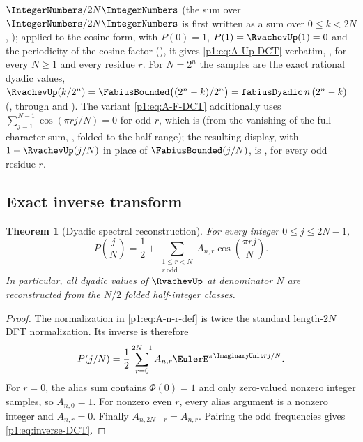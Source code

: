 \documentclass[11pt,oneside]{article}
\newtheorem{theorem}{Theorem}[section]
\theoremstyle{definition}
\theoremstyle{remark}
\newcommand{\PhiU}{\Phi}
\begin{document}
\(\IntegerNumbers/2N\IntegerNumbers\) (the sum over \(\IntegerNumbers/2N\IntegerNumbers\) is first
written as a sum over \(0\le k<2N\), ); applied to the
cosine form, with \(P(0)=1\), \(P(1)=\RvachevUp(1)=0\) and the periodicity of the cosine
factor (), it gives \eqref{p1:eq:A-Up-DCT} verbatim,
, for every \(N\ge1\) and every residue
\(r\).  For \(N=2^n\) the samples are the exact rational dyadic values,
\(\RvachevUp(k/2^n)=\FabiusBounded\bigl((2^n-k)/2^n\bigr)=\mathtt{fabiusDyadic}\,n\,(2^n-k)\)
(, through
 and ).
The variant \eqref{p1:eq:A-F-DCT} additionally uses
\(\sum_{j=1}^{N-1}\cos(\pi rj/N)=0\) for odd \(r\), which is
 (from the vanishing of the full character sum,
, folded to the half range); the resulting display,
with \(1-\RvachevUp(j/N)\) in place of \(\FabiusBounded(j/N)\), is
, for every odd residue \(r\).

\subsection{Exact inverse transform}

\begin{theorem}[Dyadic spectral reconstruction]\label{p1:thm:inverse-DCT}
For every integer $0\le j\le2N-1$,
\begin{equation}\label{p1:eq:inverse-DCT}
 \boxed{
 P\!\left(\frac jN\right)
 =\frac12+
 \sum_{\substack{1\le r<N\\r\ \mathrm{odd}}}
 A_{n,r}\cos\!\left(\frac{\pi rj}{N}\right).}
\end{equation}
In particular, all dyadic values of $\RvachevUp$ at denominator $N$ are reconstructed
from the $N/2$ folded half-integer classes.
\end{theorem}

\begin{proof}
The normalization in \eqref{p1:eq:A-n-r-def} is twice the standard length-$2N$
DFT normalization.  Its inverse is therefore
\[
 P(j/N)=\frac12\sum_{r=0}^{2N-1}A_{n,r}\EulerE^{\pi\ImaginaryUnit rj/N}.
\]
For $r=0$, the alias sum contains $\PhiU(0)=1$ and only zero-valued nonzero
integer samples, so $A_{n,0}=1$.  For nonzero even $r$, every alias argument is
a nonzero integer and $A_{n,r}=0$.  Finally
$A_{n,2N-r}=A_{n,r}$.  Pairing the odd frequencies gives
\eqref{p1:eq:inverse-DCT}.
\end{proof}
\end{document}
